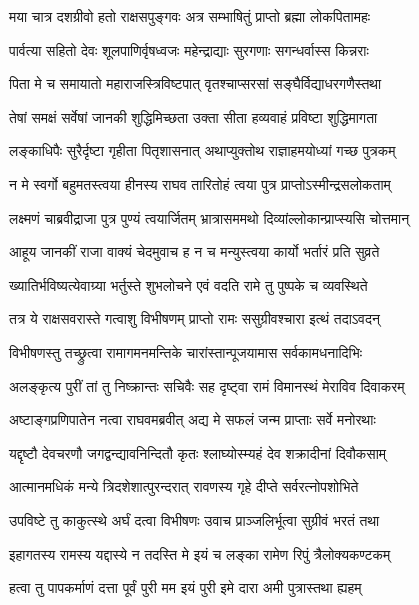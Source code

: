 \twolineshloka
{मया चात्र दशग्रीवो हतो राक्षसपुङ्गवः}
{अत्र सम्भाषितुं प्राप्तो ब्रह्मा लोकपितामहः}%

\twolineshloka
{पार्वत्या सहितो देवः शूलपाणिर्वृषध्वजः}
{महेन्द्राद्याः सुरगणाः सगन्धर्वास्स किन्नराः}%

\twolineshloka
{पिता मे च समायातो महाराजस्त्रिविष्टपात्}
{वृतश्चाप्सरसां सङ्घैर्विद्याधरगणैस्तथा}%

\twolineshloka
{तेषां समक्षं सर्वेषां जानकी शुद्धिमिच्छता}
{उक्ता सीता हव्यवाहं प्रविष्टा शुद्धिमागता}%

\twolineshloka
{लङ्काधिपैः सुरैर्दृष्टा गृहीता पितृशासनात्}
{अथाप्युक्तोथ राज्ञाहमयोध्यां गच्छ पुत्रकम्}%

\twolineshloka
{न मे स्वर्गो बहुमतस्त्वया हीनस्य राघव}
{तारितोहं त्वया पुत्र प्राप्तोऽस्मीन्द्रसलोकताम्}%

\twolineshloka
{लक्ष्मणं चाब्रवीद्राजा पुत्र पुण्यं त्वयार्जितम्}
{भ्रात्रासममथो दिव्यांल्लोकान्प्राप्स्यसि चोत्तमान्}%

\twolineshloka
{आहूय जानकीं राजा वाक्यं चेदमुवाच ह}
{न च मन्युस्त्वया कार्यो भर्तारं प्रति सुव्रते}%

\twolineshloka
{ख्यातिर्भविष्यत्येवाग्र्या भर्तुस्ते शुभलोचने}
{एवं वदति रामे तु पुष्पके च व्यवस्थिते}%

\twolineshloka
{तत्र ये राक्षसवरास्ते गत्वाशु विभीषणम्}
{प्राप्तो रामः ससुग्रीवश्चारा इत्थं तदाऽवदन्}%

\twolineshloka
{विभीषणस्तु तच्छ्रुत्वा रामागमनमन्तिके}
{चारांस्तान्पूजयामास सर्वकामधनादिभिः}%

\twolineshloka
{अलङ्कृत्य पुरीं तां तु निष्क्रान्तः सचिवैः सह}
{दृष्ट्वा रामं विमानस्थं मेराविव दिवाकरम्}%

\twolineshloka
{अष्टाङ्गप्रणिपातेन नत्वा राघवमब्रवीत्}
{अद्य मे सफलं जन्म प्राप्ताः सर्वे मनोरथाः}%

\twolineshloka
{यद्दृष्टौ देवचरणौ जगद्वन्द्यावनिन्दितौ}
{कृतः श्लाघ्योस्म्यहं देव शक्रादीनां दिवौकसाम्}%

\twolineshloka
{आत्मानमधिकं मन्ये त्रिदशेशात्पुरन्दरात्}
{रावणस्य गृहे दीप्ते सर्वरत्नोपशोभिते}%

\twolineshloka
{उपविष्टे तु काकुत्स्थे अर्घं दत्वा विभीषणः}
{उवाच प्राञ्जलिर्भूत्वा सुग्रीवं भरतं तथा}%

\twolineshloka
{इहागतस्य रामस्य यद्दास्ये न तदस्ति मे}
{इयं च लङ्का रामेण रिपुं त्रैलोक्यकण्टकम्}%

\twolineshloka
{हत्वा तु पापकर्माणं दत्ता पूर्वं पुरी मम}
{इयं पुरी इमे दारा अमी पुत्रास्तथा ह्यहम्}%

